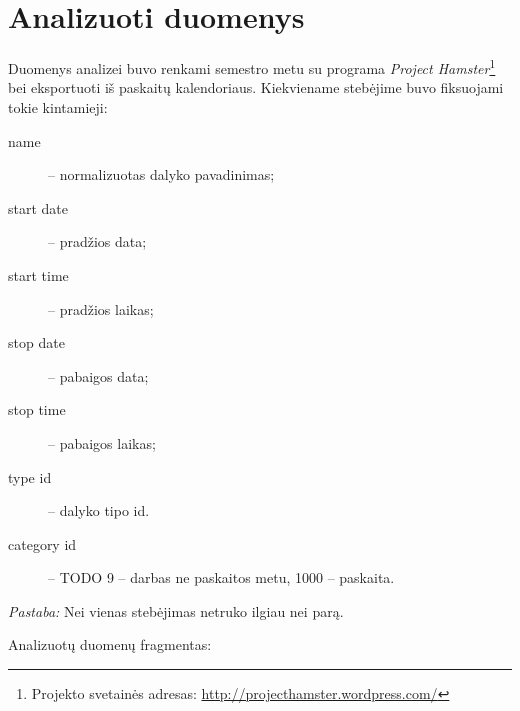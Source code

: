 \chapter{Analizuoti duomenys}

Duomenys analizei buvo renkami semestro metu su programa
\emph{Project Hamster}\footnote{
Projekto svetainės adresas: \url{http://projecthamster.wordpress.com/}}
bei eksportuoti iš paskaitų kalendoriaus. Kiekviename stebėjime buvo
fiksuojami tokie kintamieji:
\begin{description}
  \item[name] – normalizuotas dalyko pavadinimas;
  \item[start date] – pradžios data;
  \item[start time] – pradžios laikas;
  \item[stop date] – pabaigos data;
  \item[stop time] – pabaigos laikas;
  \item[type id] – dalyko tipo id.
  \item[category id] – TODO 9 – darbas ne paskaitos metu, 1000 – paskaita.
\end{description}

\emph{Pastaba:} Nei vienas stebėjimas netruko ilgiau nei parą.

Analizuotų duomenų fragmentas:

